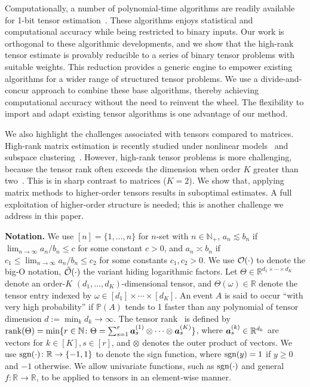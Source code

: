 \documentclass{article}
\theoremstyle{plain}
\theoremstyle{definition}
\def\sign{\textup{sgn}}
\begin{document}
Computationally, a number of polynomial-time algorithms are readily available for 1-bit tensor estimation~\cite{wang2018learning, han2020optimal, ghadermarzy2018learning}. These algorithms enjoys statistical and computational accuracy while being restricted to binary inputs. Our work is orthogonal to these algorithmic developments, and we show that the high-rank tensor estimate is provably reducible to a series of binary tensor problems with suitable weights. This reduction provides a generic engine to empower existing algorithms for a wider range of structured tensor problems. We use a divide-and-concur approach to combine these base algorithms, thereby achieving computational accuracy without the need to reinvent the wheel. The flexibility to import and adapt existing tensor algorithms is one advantage of our method. 

We also highlight the challenges associated with tensors compared to matrices. High-rank matrix estimation is recently studied under nonlinear models~\citep{ganti2015matrix} and subspace clustering~\citep{pmlr-v70-ongie17a,fan2019online}. However, high-rank tensor problems is more challenging, because the tensor rank often exceeds the dimension when order $K$ greater than two~\citep{anandkumar2017analyzing}. This is in sharp contrast to matrices ($K=2$). We show that, applying matrix methods to higher-order tensors results in suboptimal estimates. A full exploitation of higher-order structure is needed; this is another challenge we address in this paper.

{\bf Notation.} We use $[n]=\{1,\ldots,n\}$ for $n$-set with $n\in\mathbb{N}_{+}$, $a_n\lesssim b_n$ if $\lim_{n\to\infty} a_n/b_n\leq c$ for some constant $c>0$, and $a_n\asymp b_n$ if $c_1\leq \lim_{n\to \infty} a_n/b_n\leq c_2$ for some constants $c_1,c_2>0$. We use $\mathcal{O}(\cdot)$ to denote the big-O notation, $\tilde {\mathcal{O}}(\cdot)$ the variant hiding logarithmic factors. Let $\Theta\in\mathbb{R}^{d_1\times \cdots \times d_K}$ denote an order-$K$ $(d_1,\ldots,d_K)$-dimensional tensor, and $\Theta(\omega)\in\mathbb{R}$ denote the tensor entry indexed by $\omega \in[d_1]\times \cdots \times [d_K]$. An event $A$ is said to occur ``with very high probability'' if $\mathbb{P}(A)$ tends to 1 faster than any polynomial of tensor dimension $d:=\min_k d_k \to\infty$. The tensor rank~\citep{hitchcock1927expression} is defined by $\text{rank}(\Theta)=\min\{r\in\mathbb{N}\colon \Theta=\sum_{s=1}^r\bm{a}^{(1)}_s\otimes\cdots\otimes \bm{a}^{(K)}_s\}$, where $\bm{a}^{(k)}_s\in\mathbb{R}^{d_k}$ are vectors for $k\in[K], s\in[r]$, and $\otimes$ denotes the outer product of vectors. We use $\sign(\cdot)\colon \mathbb{R}\to\{-1,1\}$ to denote the sign function, where $\sign(y)=1$ if $y\geq 0$ and $-1$ otherwise. We allow univariate functions, such as $\sign(\cdot)$ and general $f\colon \mathbb{R}\to\mathbb{R}$, to be applied to tensors in an element-wise manner. 
\end{document}
